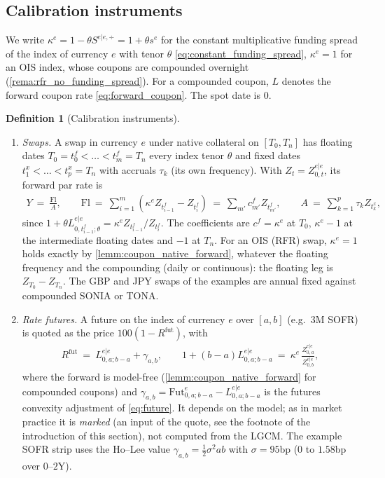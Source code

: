 \documentclass[11pt,english]{amsart}
\newcommand{\Fl}{\mathrm{Fl}}
\theoremstyle{definition}
\newtheorem{defi}{Definition}
\begin{document}
\subsection{Calibration instruments}\label{ssec:calibration_instruments}

We write $\kappa^e = 1-\theta S^{e|e,\div} = 1+\theta s^e$ for the constant multiplicative funding spread of the index of currency $e$ with tenor $\theta$ \eqref{eq:constant_funding_spread}, $\kappa^e = 1$ for an OIS index, whose coupons are compounded overnight (\autoref{rema:rfr_no_funding_spread}). For a compounded coupon, $L$ denotes the forward coupon rate \eqref{eq:forward_coupon}. The spot date is $0$.

\begin{defi}[Calibration instruments]\label{defi:calibration_instruments}
\begin{enumerate}
\item \emph{Swaps.} A swap in currency $e$ under native collateral on $[T_0,T_n]$ has floating dates $T_0 = t^f_0 < \ldots < t^f_m = T_n$ every index tenor $\theta$ and fixed dates $t^x_1 < \ldots < t^x_p = T_n$ with accruals $\tau_k$ (its own frequency). With $Z_t = Z^{e|e}_{0,t}$, its forward par rate is
\begin{eqnarray}
  Y ~=~ \frac{\Fl}{A}, \qquad \Fl ~=~ \sum_{i=1}^m \left( \kappa^e Z_{t^f_{i-1}} - Z_{t^f_i} \right) ~=~ \sum_{m'} c^f_{m'} Z_{t^f_{m'}} , \qquad A ~=~ \sum_{k=1}^p \tau_k Z_{t^x_k} ,
  \label{eq:cal_swap_rate}
\end{eqnarray}
since $1+\theta L^{e|e}_{0,t^f_{i-1};\theta} = \kappa^e Z_{t^f_{i-1}}/Z_{t^f_i}$. The coefficients are $c^f = \kappa^e$ at $T_0$, $\kappa^e - 1$ at the intermediate floating dates and $-1$ at $T_n$. For an OIS (RFR) swap, $\kappa^e = 1$ holds exactly by \autoref{lemm:coupon_native_forward}, whatever the floating frequency and the compounding (daily or continuous): the floating leg is $Z_{T_0} - Z_{T_n}$. The GBP and JPY swaps of the examples are annual fixed against compounded SONIA or TONA.
\item \emph{Rate futures.} A future on the index of currency $e$ over $[a,b]$ (e.g.\ $3$M SOFR) is quoted as the price $100(1-R^{\mathrm{fut}})$, with
\begin{eqnarray}
  R^{\mathrm{fut}} ~=~ L^{e|e}_{0,a;b-a} + \gamma_{a,b} , \qquad 1+(b-a)L^{e|e}_{0,a;b-a} ~=~ \kappa^e\,\frac{Z^{e|e}_{0,a}}{Z^{e|e}_{0,b}} ,
  \label{eq:cal_future}
\end{eqnarray}
where the forward is model-free (\autoref{lemm:coupon_native_forward} for compounded coupons) and $\gamma_{a,b} = \mathrm{Fut}^e_{0,a;b-a} - L^{e|e}_{0,a;b-a}$ is the futures convexity adjustment of \eqref{eq:future}. It depends on the model; as in market practice it is \emph{marked} (an input of the quote, see the footnote of the introduction of this section), not computed from the LGCM. The example SOFR strip uses the Ho--Lee value $\gamma_{a,b} = \frac12\sigma^2ab$ with $\sigma = 95$bp ($0$ to $1.58$bp over $0$--$2$Y).

\end{enumerate}
\end{defi}
\end{document}
